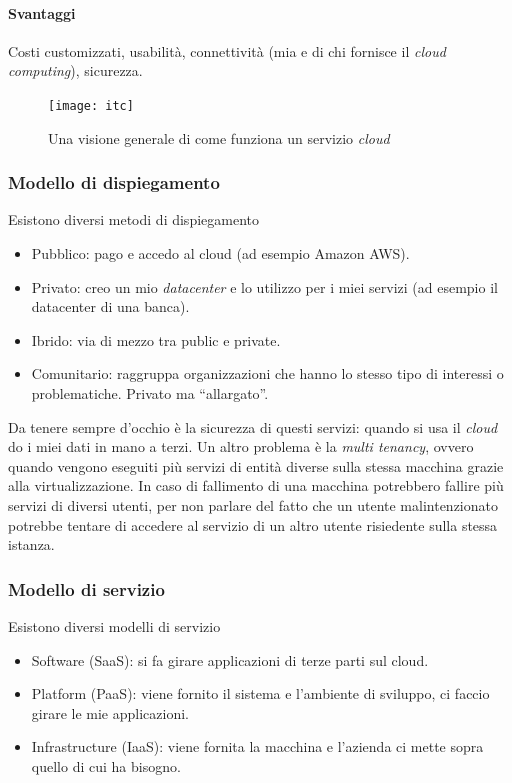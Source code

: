 \paragraph*{Svantaggi} Costi customizzati, usabilità, connettività (mia e di
chi fornisce il \textit{cloud computing}), sicurezza.


\begin{figure}[H]
 \centering
 \texttt{[image: itc]}
 \caption{Una visione generale di come funziona un servizio \textit{cloud}}
\end{figure}

\subsubsection{Modello di dispiegamento}

Esistono diversi metodi di dispiegamento
\begin{itemize}
  \item Pubblico: pago e accedo al cloud (ad esempio Amazon AWS).

  \item Privato: creo un mio \textit{datacenter} e lo utilizzo per i miei
  servizi (ad esempio il datacenter di una banca).

  \item Ibrido: via di mezzo tra public e private.

  \item Comunitario: raggruppa organizzazioni che hanno lo stesso tipo di
  interessi o problematiche. Privato ma ``allargato''.

\end{itemize}

Da tenere sempre d'occhio è la sicurezza di questi servizi: quando si usa il
\textit{cloud} do i miei dati in mano a terzi. Un altro problema è la
\textit{multi tenancy}, ovvero quando vengono eseguiti più servizi di entità
diverse sulla stessa macchina grazie alla virtualizzazione. In caso di
fallimento di una macchina potrebbero fallire più servizi di diversi utenti,
per non parlare del fatto che un utente malintenzionato potrebbe tentare di
accedere al servizio di un altro utente risiedente sulla stessa istanza.

\subsubsection{Modello di servizio}

Esistono diversi modelli di servizio
\begin{itemize}
  \item Software (SaaS): si fa girare applicazioni di terze parti sul cloud.
  \item Platform (PaaS): viene fornito il sistema e l'ambiente di sviluppo, ci
  faccio girare le mie applicazioni.
  \item Infrastructure (IaaS): viene fornita la macchina e l'azienda ci mette
  sopra quello di cui ha bisogno.

\end{itemize}

